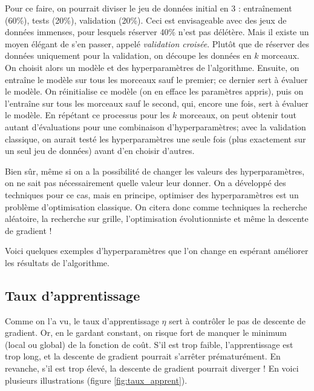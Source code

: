 Pour ce faire, on pourrait diviser le jeu de données initial en 3 : entraînement (60\%), tests (20\%), validation (20\%). Ceci est envisageable avec des jeux de données immenses, pour lesquels réserver 40\% n'est pas délétère. Mais il existe un moyen élégant de s'en passer, appelé \emph{validation croisée}. Plutôt que de réserver des données uniquement pour la validation, on découpe les données en \(k\) morceaux. On choisit alors un modèle et des hyperparamètres de l'algorithme. Ensuite, on entraîne le modèle sur tous les morceaux sauf le premier; ce dernier sert à évaluer le modèle. On réinitialise ce modèle (on en efface les paramètres appris), puis on l'entraîne sur tous les morceaux sauf le second, qui, encore une fois, sert à évaluer le modèle. En répétant ce processus pour les \(k\) morceaux, on peut obtenir tout autant d'évaluations pour une combinaison d'hyperparamètres; avec la validation classique, on aurait testé les hyperparamètres une seule fois (plus exactement sur un seul jeu de données) avant d'en choisir d'autres.

Bien sûr, même si on a la possibilité de changer les valeurs des hyperparamètres, on ne sait pas nécessairement quelle valeur leur donner. On a développé des techniques pour ce cas, mais en principe, optimiser des hyperparamètres est un problème d'optimisation classique. On citera donc comme techniques la recherche aléatoire, la recherche sur grille, l'optimisation évolutionniste et même la descente de gradient !

Voici quelques exemples d'hyperparamètres que l'on change en espérant améliorer les résultats de l'algorithme.

\subsection{Taux d'apprentissage}
Comme on l'a vu, le taux d'apprentissage \(\eta\) sert à contrôler le pas de descente de gradient. Or, en le gardant constant, on risque fort de manquer le minimum (local ou global) de la fonction de coût. S'il est trop faible, l'apprentissage est trop long, et la descente de gradient pourrait s'arrêter prématurément. En revanche, s'il est trop élevé, la descente de gradient pourrait diverger ! En voici plusieurs illustrations (figure \ref{fig:taux_apprent}).

